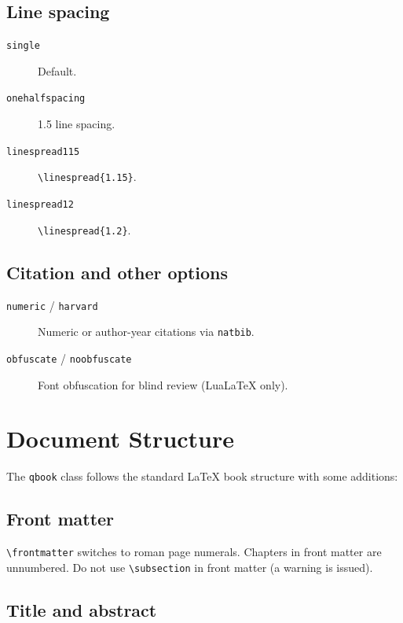 \documentclass[sans,oneside,numeric,raggedright,fullwidth]{qbook}
\begin{document}
\subsection{Line spacing}

\begin{description}
  \item[\texttt{single}] Default.
  \item[\texttt{onehalfspacing}] 1.5 line spacing.
    \item[\texttt{linespread115}] \verb|\linespread{1.15}|.
    \item[\texttt{linespread12}] \verb|\linespread{1.2}|.
\end{description}

\subsection{Citation and other options}

\begin{description}
  \item[\texttt{numeric} / \texttt{harvard}] Numeric or author-year
    citations via \texttt{natbib}.
  \item[\texttt{obfuscate} / \texttt{noobfuscate}] Font obfuscation for
    blind review (LuaLaTeX only).
\end{description}

\lipsum[2]

\section{Document Structure}\label{sec:structure}

The \texttt{qbook} class follows the standard \LaTeX{} book structure
with some additions:

\subsection{Front matter}

\verb|\frontmatter| switches to roman page numerals.  Chapters in front
matter are unnumbered.  Do not use \verb|\subsection| in front matter (a
warning is issued).

\subsection{Title and abstract}
\end{document}
